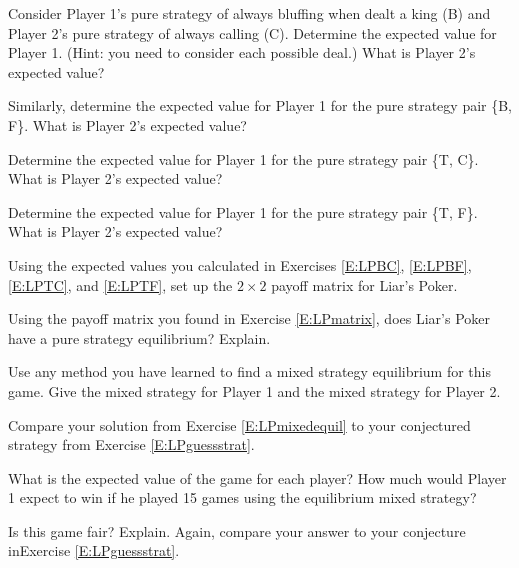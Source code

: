 
\begin{xca}\label{E:LPBC}
Consider Player 1's pure strategy of always bluffing when dealt a king (B) and Player 2's pure strategy of always calling (C). Determine the expected value for Player 1. (Hint: you need to consider each possible deal.) What is Player 2's expected value? 
\end{xca}

\begin{xca}\label{E:LPBF}
Similarly, determine the expected value for Player 1 for the pure strategy pair \{B, F\}. What is Player 2's expected value? 
\end{xca}

\begin{xca}\label{E:LPTC}
Determine the expected value for Player 1 for the pure strategy pair \{T, C\}. What is Player 2's expected value? 
\end{xca}

\begin{xca}\label{E:LPTF}
Determine the expected value for Player 1 for the pure strategy pair \{T, F\}. What is Player 2's expected value? 
\end{xca}

\begin{xca}\label{E:LPmatrix}
Using the expected values you calculated in Exercises \ref{E:LPBC}, \ref{E:LPBF}, \ref{E:LPTC}, and \ref{E:LPTF}, set up the $2 \times 2$ payoff matrix for Liar's Poker.
\end{xca}

\begin{xca}\label{E:LPpureequil}
Using the payoff matrix you found in Exercise \ref{E:LPmatrix}, does Liar's Poker have a pure strategy equilibrium? Explain.
\end{xca}

\begin{xca}\label{E:LPmixedequil}
Use any method you have learned to find a mixed strategy equilibrium for this game. Give the mixed strategy for Player 1 and the mixed strategy for Player 2.
\end{xca}

\begin{xca}\label{E:LPcompare}
Compare your solution from Exercise \ref{E:LPmixedequil} to your conjectured strategy from Exercise \ref{E:LPguessstrat}. 
\end{xca}

\begin{xca}\label{E:LPexpectedvalue}
What is the expected value of the game for each player?  How much would Player 1 expect to win if he played 15 games using the equilibrium mixed strategy? 
\end{xca}


\begin{xca}\label{E:LPfair} 
Is this game fair? Explain. Again, compare your answer to your conjecture inExercise \ref{E:LPguessstrat}.
\end{xca}




 